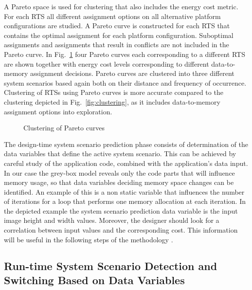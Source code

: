 \documentclass{acm_proc_article-sp}
\begin{document}
A Pareto space is used for clustering that also includes the energy cost metric. For each RTS all different assignment options on all alternative platform configurations are studied. A Pareto curve is constructed for each RTS that contains the optimal assignment for each platform configuration. Suboptimal assignments and assignments that result in conflicts are not included in the Pareto curve. In Fig.~\ref{fig:pareto} four Pareto curves each corresponding to a different RTS are shown together with energy cost levels corresponding to different data-to-memory assignment decisions. Pareto curves are clustered into three different system scenarios based again both on their distance and frequency of occurrence. Clustering of RTSs using Pareto curves is more accurate compared to the clustering depicted in Fig.~\ref{fig:clustering}, as it includes   data-to-memory assignment options into exploration. 

\begin{figure}[!t]
\centering
\caption{Clustering of Pareto curves}
\label{fig:pareto}
\end{figure}

The design-time system scenario prediction phase consists of determination of the data variables that define the active system scenario. This can be achieved by careful study of the application code, combined with the application's data input. In our case the grey-box model reveals only the code parts that will influence memory usage, so that data variables deciding memory space changes can be identified. An example of this is a non static variable that influences the number of iterations for a loop that performs one memory allocation at each iteration. In the depicted example the system scenario prediction data variable is the input image height and width values. Moreover, the designer should look for a correlation between input values and the corresponding cost. This information will be useful in the following steps of the methodology \cite{tcm}.

\subsection{Run-time System Scenario Detection and Switching Based on Data Variables}
\end{document}
